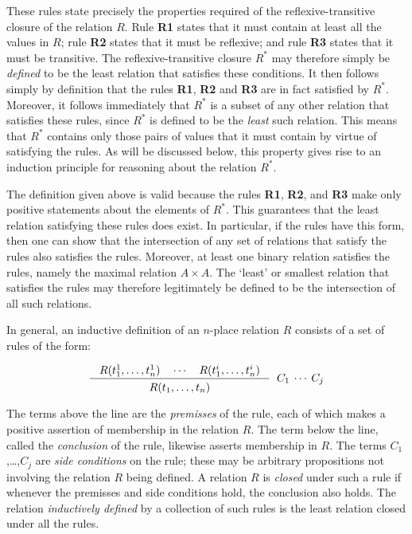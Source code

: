 \noindent These rules state precisely the properties required of the
reflexive-transitive closure of the relation $R$.  Rule {{\small\bf R}\bf 1}
states that it must contain at least all the values in $R$; rule {{\small\bf
R}\bf 2} states that it must be reflexive; and rule {{\small\bf R}\bf 3} states
that it must be transitive.  The reflexive-transitive closure $R^{*}$ may
therefore simply be {\it defined\/} to be the least relation that satisfies
these conditions.  It then follows simply by definition that the rules
{{\small\bf R}\bf 1}, {{\small\bf R}\bf 2} and {{\small\bf R}\bf 3} are in fact
satisfied by $R^{*}$.  Moreover, it follows immediately that $R^{*}$ is a
subset of any other relation that satisfies these rules, since $R^{*}$ is
defined to be the {\it least\/} such relation.  This means that $R^{*}$
contains only those pairs of values that it must contain by virtue of
satisfying the rules. As will be discussed below, this property gives rise to
an induction principle for reasoning about the relation $R^{*}$.

The definition given above is valid because the rules {{\small\bf R}\bf 1},
{{\small\bf R}\bf 2}, and {{\small\bf R}\bf 3} make only positive statements
about the elements of $R^{*}$.  This guarantees that the least relation
satisfying these rules does exist.  In particular, if the rules have this form,
then one can show that the intersection of any set of relations that satisfy
the rules also satisfies the rules.  Moreover, at least one binary relation
satisfies the rules, namely the maximal relation $A \times A$. The `least' or
smallest relation that satisfies the rules may therefore legitimately be
defined to be the intersection of all such relations.  

In general, an inductive definition of an $n$-place \mbox{relation} $R$
consists of a set of rules of the form:

\smallskip

\[ \Rule{R(t_1^1,\dots,t_n^1) \quad \cdots \quad R(t_1^i,\dots,t_n^i)}
        {R(t_1,\dots,t_n)}\;\;C_1\:\cdots\:C_j \]

\smallskip

\noindent The terms above the line are the {\it premisses\/} of the rule, each
of which makes a positive assertion of membership in the relation $R$.  The
term below the line, called the {\it conclusion\/} of the rule, likewise
asserts membership in $R$. The terms $C_1$,\dots,$C_j$ are {\it side
conditions\/} on the rule; these may be arbitrary propositions not involving
the relation $R$ being defined. A relation $R$ is {\it closed\/} under such a
rule if whenever the premisses and side conditions hold, the conclusion also
holds.  The relation {\it inductively defined\/} by a collection of such rules
is the least relation closed under all the rules.

